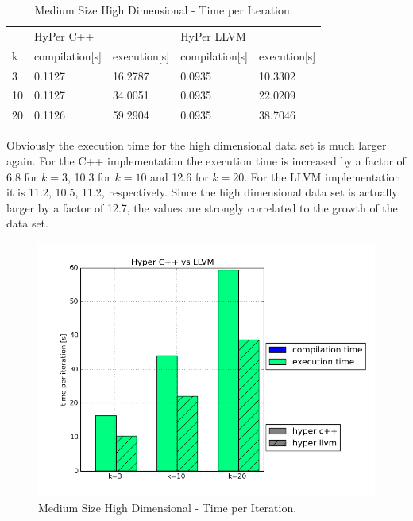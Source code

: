 \begin{table}[htsb]
  \caption[Medium Size High Dimensional - Time per Iteration]{Medium Size High Dimensional - Time per Iteration.}
  \label{tab:med_hd_serial}
  \centering
  \begin{tabular}{l l l l l}
    \toprule
      & HyPer C++ & & HyPer LLVM & \\
      k & compilation[s] & execution[s] & compilation[s] & execution[s] \\
    \midrule
      3  & 0.1127 & 16.2787 & 0.0935 & 10.3302 \\
      10 & 0.1127 & 34.0051 & 0.0935 & 22.0209 \\
      20 & 0.1126 & 59.2904 & 0.0935 & 38.7046 \\
    \bottomrule
  \end{tabular}
\end{table}

Obviously the execution time for the high dimensional data set is much larger again. For the C++ implementation the execution time is increased by a factor of 6.8 for $k = 3$, 10.3 for $k = 10$ and 12.6 for $k = 20$. For the LLVM implementation it is 11.2, 10.5, 11.2, respectively. Since the high dimensional data set is actually larger by a factor of 12.7, the values are strongly correlated to the growth of the data set.

\begin{figure}[htsb]
  \centering
  \includegraphics[scale=0.4, trim="0cm 1.5cm 0cm 0cm"]{figures/charts/hyper_15Mxhd}
  \caption[Medium Size High Dimensional - Time per Iteration]{Medium Size High Dimensional - Time per Iteration.}
  \label{fig:hyper_15Mxhd}
\end{figure}




